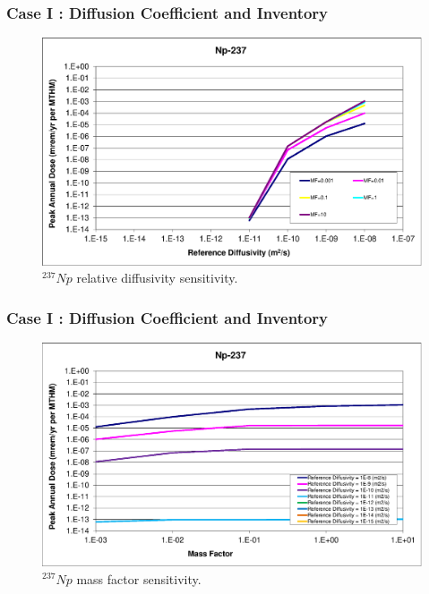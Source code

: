\begin{frame}[c]
  \frametitle{Case I : Diffusion Coefficient and Inventory}


\begin{figure}[ht!]
\centering
\includegraphics[width=\linewidth]{DiffCoeffAndInvEBSFail/Np-237.eps}
\caption{$^{237}Np$ relative diffusivity sensitivity.} 
\label{fig:DCInvNp237}
\end{figure}
\end{frame}

\begin{frame}[c]
  \frametitle{Case I : Diffusion Coefficient and Inventory}

\begin{figure}[ht!]
\centering
\includegraphics[width=\linewidth]{DiffCoeffAndInvEBSFail/Np-237-MF.eps}
\caption{$^{237}Np$ mass factor sensitivity.}
\label{fig:DCInvNp237MF}
\end{figure}
\end{frame}
